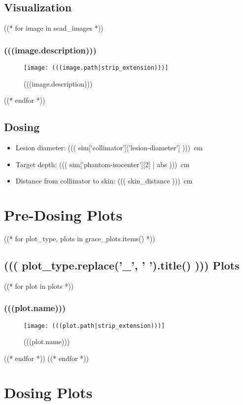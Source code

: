 \documentclass[12pt]{article}
\begin{document}
\subsection{Visualization}
((* for image in scad_images *))
	\subsubsection{(((image.description)))}
	\begin{figure}[H]
	\centering
	\texttt{[image: (((image.path|strip\_extension)))]}
	\caption{(((image.description)))}
	\end{figure}
((* endfor *))

\subsection{Dosing}
\begin{itemize}
	\item Lesion diameter: \SI{((( sim['collimator']['lesion-diameter']  )))}{\cm}
	\item Target depth: \SI{((( sim['phantom-isocenter'][2] | abs )))}{\cm}
	\item Distance from collimator to skin: \SI{((( skin_distance )))}{\cm}
\end{itemize}

\section{Pre-Dosing Plots}
((* for plot_type, plots in grace_plots.items() *))
	\subsection{((( plot_type.replace('_', ' ').title() ))) Plots}
		((* for plot in plots *))
			\subsubsection{(((plot.name)))}
			\begin{figure}[H]
			\centering
			\texttt{[image: (((plot.path|strip\_extension)))]}
			\caption{(((plot.name)))}
			\label{fig:(((plot.slug)))}
			\end{figure}
		((* endfor *))
((* endfor *))

\section{Dosing Plots}
\end{document}
